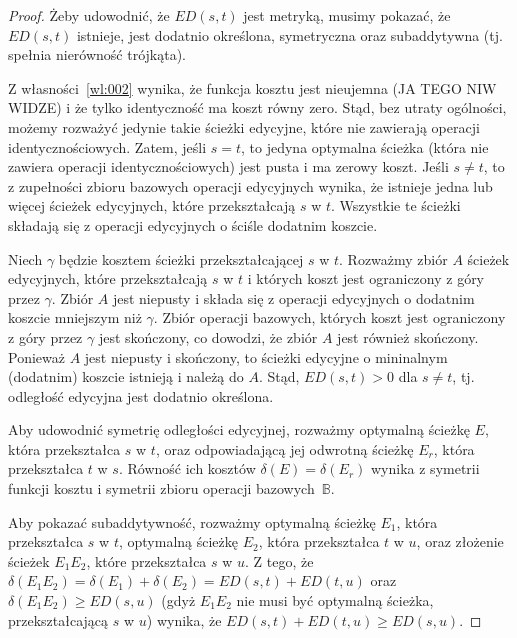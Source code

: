 \documentclass{praca1}
\begin{document}
\begin{proof}
Żeby udowodnić, że $ED(s,t)$ jest metryką, musimy pokazać, że $ED(s,t)$ istnieje, 	jest dodatnio określona, symetryczna oraz subaddytywna (tj. spełnia nierówność trójkąta).

Z własności~\ref{wl:002} wynika, że funkcja kosztu jest nieujemna (JA TEGO NIW WIDZE) i że tylko identyczność ma koszt równy zero. Stąd, bez utraty ogólności, możemy rozważyć jedynie takie ścieżki edycyjne, które nie zawierają operacji identycznościowych. Zatem, jeśli $s=t$, to jedyna optymalna ścieżka (która nie zawiera operacji identycznościowych) jest pusta i ma zerowy koszt. Jeśli $s\neq t$, to z zupełności zbioru bazowych operacji edycyjnych wynika, że istnieje jedna lub więcej ścieżek edycyjnych, które przekształcają $s$ w $t$. Wszystkie te ścieżki składają się z operacji edycyjnych o ściśle dodatnim koszcie.

Niech $\gamma$ będzie kosztem ścieżki przekształcającej $s$ w $t$. Rozważmy zbiór $A$ ścieżek edycyjnych, które przekształcają $s$ w $t$ i których koszt jest ograniczony z góry przez $\gamma$. Zbiór $A$ jest niepusty i składa się z operacji edycyjnych o dodatnim koszcie mniejszym niż $\gamma$. Zbiór operacji bazowych, których koszt jest ograniczony z góry przez $\gamma$ jest skończony, co dowodzi, że zbiór $A$ jest również skończony. Ponieważ $A$ jest niepusty i skończony, to ścieżki edycyjne o mininalnym (dodatnim) koszcie istnieją i należą do $A$. Stąd, $ED(s,t) > 0$ dla $s\neq t$, tj. odległość edycyjna jest dodatnio określona.

Aby udowodnić symetrię odległości edycyjnej, rozważmy optymalną ścieżkę $E$, która przekształca $s$ w $t$, oraz odpowiadającą jej odwrotną ścieżkę $E_r$, która przekształca $t$ w $s$. Równość ich kosztów $\delta(E) = \delta(E_r)$ wynika z symetrii funkcji kosztu i symetrii zbioru operacji bazowych~$\mathbb{B}$. 

Aby pokazać subaddytywność, rozważmy optymalną ścieżkę $E_1$, która przekształca $s$ w $t$, optymalną ścieżkę $E_2$, która przekształca $t$ w $u$, oraz złożenie ścieżek $E_1E_2$, które przekształca $s$ w $u$. Z tego, że $\delta(E_1E_2) = \delta(E_1) + \delta(E_2) = ED(s,t)+ED(t,u)$ oraz $\delta(E_1E_2) \geq ED(s,u)$ (gdyż $E_1 E_2$ nie musi być optymalną ścieżka, przekształcającą $s$ w $u$) wynika, że $ED(s,t)+ED(t,u) \geq ED(s,u)$.
\end{proof}
\end{document}
